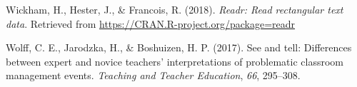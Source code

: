 \documentclass[
  english,
  man,floatsintext]{apa6}
\begin{document}
\leavevmode\hypertarget{ref-R-readr}{}%
Wickham, H., Hester, J., \& Francois, R. (2018). \emph{Readr: Read rectangular text data}. Retrieved from \url{https://CRAN.R-project.org/package=readr}

\leavevmode\hypertarget{ref-wolff2017see}{}%
Wolff, C. E., Jarodzka, H., \& Boshuizen, H. P. (2017). See and tell: Differences between expert and novice teachers' interpretations of problematic classroom management events. \emph{Teaching and Teacher Education}, \emph{66}, 295--308.

\endgroup
\end{document}
